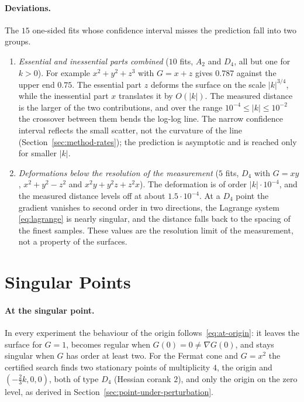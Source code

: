 


\paragraph{Deviations.} The $15$ one-sided fits whose confidence interval
misses the prediction fall into two groups.
\begin{enumerate}
    \item \emph{Essential and inessential parts combined} ($10$ fits, $A_2$ and
          $D_4$, all but one for $k>0$). For example $x^2+y^2+z^3$ with $G=x+z$ gives $0.787$
          against the upper end $0.75$. The essential part $z$ deforms the
          surface on the scale $|k|^{3/4}$, while the inessential part $x$
          translates it by $O(|k|)$. The measured distance is the larger of the
          two contributions, and over the range $10^{-4}\le|k|\le10^{-2}$ the
          crossover between them bends the log-log line. The narrow confidence
          interval reflects the small scatter, not the curvature of the line
          (Section~\ref{sec:method-rates}); the prediction is asymptotic and
          is reached only for smaller $|k|$.
    \item \emph{Deformations below the resolution of the measurement} ($5$ fits,
          $D_4$ with $G=xy$, $x^2+y^2-z^2$ and $x^2y+y^2z+z^2x$). The deformation
          is of order $|k|\cdot10^{-4}$, and the measured distance levels off at
          about $1.5\cdot10^{-4}$. At a $D_4$ point the gradient vanishes to second
          order in two directions, the Lagrange system \eqref{eq:lagrange} is
          nearly singular, and the distance falls back to the spacing of the
          finest samples. These values are the resolution limit of the
          measurement, not a property of the surfaces.
\end{enumerate}

\section{Singular Points}
\label{sec:exp-singular}

\paragraph{At the singular point.} In every experiment the behaviour of the
origin follows~\eqref{eq:at-origin}: it leaves the surface for $G=1$, becomes
regular when $G(0)=0\neq\nabla G(0)$, and stays singular when $G$ has order at
least two. For the Fermat cone and $G=x^2$ the certified search finds two
stationary points of multiplicity $4$, the origin and $(-\frac23k,0,0)$, both of
type $D_4$ (Hessian corank $2$), and only the origin on the zero level, as
derived in Section~\ref{sec:point-under-perturbation}.

